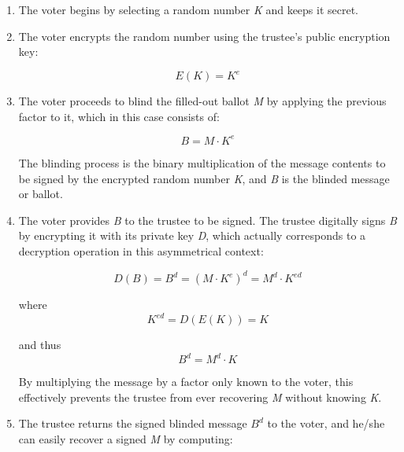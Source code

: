 \documentclass[../access.tex]{subfiles}
\begin{document}
            \begin{enumerate}
                \item The voter begins by selecting a random number \textit{K} and keeps it secret.
                \item The voter encrypts the random number using the trustee's public encryption key: 
                    
                    \begin{equation}
                        E(K) = K^{e}
                    \end{equation}
                    
                \item The voter proceeds to blind the filled-out ballot \textit{M} by applying the previous factor to it, which in this case consists of:

                    \begin{equation}
                        B = M \cdot K^{e}
                    \end{equation}

                The blinding process is the binary multiplication of the message contents to be signed by the encrypted random number \textit{K}, and \textit{B} is the blinded message or ballot.
                \item The voter provides \textit{B} to the trustee to be signed. The trustee digitally signs \textit{B} by encrypting it with its private key \textit{D}, which actually corresponds to a decryption operation in this asymmetrical context:
                    
                    \begin{equation}
                        D(B) = B^{d} = (M \cdot K^{e})^{d} = M^{d} \cdot K^{ed}
                    \end{equation}    
                
                where 
                    \begin{equation}
                        K^{ed} = D(E(K)) = K
                    \end{equation}
                    
                and thus 
                    \begin{equation}
                        B^{d} = M^{d} \cdot K
                    \end{equation}
                    
                By multiplying the message by a factor only known to the voter, this effectively prevents the trustee from ever recovering \textit{M} without knowing \textit{K}.
                \item The trustee returns the signed blinded message $ B^{d} $ to the voter, and he/she can easily recover a signed \textit{M} by computing: 
                

\end{enumerate}
\end{document}
